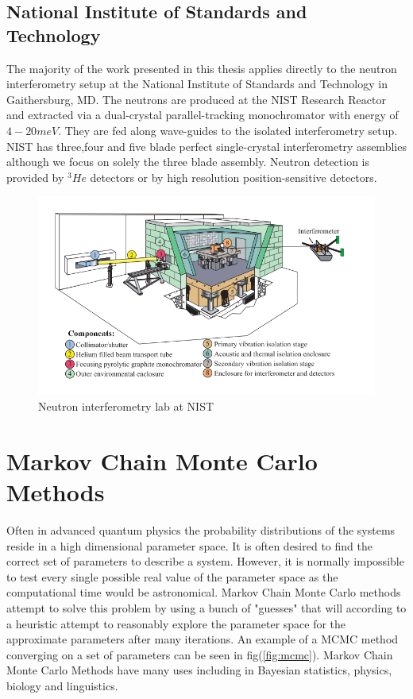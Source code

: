 \subsection{National Institute of Standards and Technology}
The majority of the work presented in this thesis applies directly to the neutron interferometry setup at the National Institute of Standards and Technology in Gaithersburg, MD. The neutrons are produced at the NIST Research Reactor and extracted via a dual-crystal parallel-tracking monochromator with energy of $4-20 meV$. They are fed along wave-guides to the isolated interferometry setup. NIST has three,four and five blade perfect single-crystal interferometry assemblies although we focus on solely the three blade assembly. Neutron detection is provided by $^3He$ detectors or by high resolution position-sensitive detectors.\cite{nist_setup}\cite{nist_powerpoint} 
\begin{figure}[ht!]
\centering
\includegraphics[scale=0.5]{Figures/neutroninterferometer.png}
\caption{Neutron interferometry lab at NIST \cite{dimaThesis}}
\label{fig:neutroninterferometerlab}
\end{figure}
\section{Markov Chain Monte Carlo Methods}
Often in advanced quantum physics the probability distributions of the systems reside in a high dimensional parameter space. It is often desired to find the correct set of parameters to describe a system. However, it is normally impossible to test every single possible real value of the parameter space as the computational time would be astronomical. Markov Chain Monte Carlo methods attempt to solve this problem by using a bunch of "guesses" that will according to a heuristic attempt to reasonably explore the parameter space for the approximate parameters after many iterations. An example of a MCMC method converging on a set of parameters can be seen in fig(\ref{fig:mcmc}). Markov Chain Monte Carlo Methods have many uses including in Bayesian statistics, physics, biology and linguistics.\cite{mcmc}

